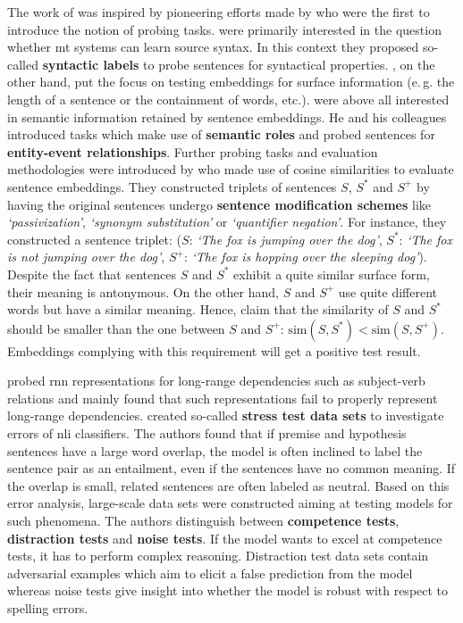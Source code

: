 The work of \citep{Conneau.2018a} was inspired by pioneering efforts made by \citep{Ettinger.2016,Shi.2016,Adi.2017} who were the first to introduce the notion of probing tasks. \citep{Shi.2016} were primarily interested in the question whether \gls{mt} systems can learn source syntax. In this context they proposed so-called \textbf{syntactic labels} to probe sentences for syntactical properties. \citep{Adi.2017}, on the other hand, put the focus on testing embeddings for surface information (e.\,g. the length of a sentence or the  containment of words, etc.). \citep{Ettinger.2016} were above all interested in semantic information retained by sentence embeddings. He and his colleagues introduced tasks which make use of \textbf{semantic roles} and probed sentences for \textbf{entity-event relationships}. Further probing tasks and evaluation methodologies were introduced by \citep{Zhu.2018} who made use of cosine similarities to evaluate sentence embeddings. They constructed triplets of sentences $S$, $S^*$ and $S^+$ by having the original sentences undergo \textbf{sentence modification schemes} like \textit{`passivization'}, \textit{`synonym substitution'} or \textit{`quantifier negation'}. For instance, they constructed a sentence triplet: ($S$: \textit{`The fox is jumping over the dog'}, $S^*$: \textit{`The fox is not jumping over the dog'}, $S^+$: \textit{`The fox is hopping over the sleeping dog'}). Despite the fact that sentences $S$ and $S^*$ exhibit a quite similar surface form, their meaning is antonymous. On the other hand, $S$ and $S^+$ use quite different words but have a similar meaning. Hence, \citep{Zhu.2018} claim that the similarity of $S$ and $S^*$ should be smaller than the one between $S$ and $S^+$: $\text{sim}(S, S^*) < \text{sim}(S, S^+)$. Embeddings complying with this requirement will get a positive test result.

\citep{Linzen.2016,Gulordava.2018} probed \gls{rnn} representations for long-range dependencies such as subject-verb relations and mainly found that such representations fail to properly represent long-range dependencies. \citep{Naik.2018} created so-called \textbf{stress test data sets} to investigate errors of \gls{nli} classifiers. The authors found that if premise and hypothesis sentences have a large word overlap, the model is often inclined to label the sentence pair as an entailment, even if the sentences have no common meaning. If the overlap is small, related sentences are often labeled as neutral. Based on this error analysis, large-scale data sets were constructed aiming at testing models for such phenomena. The authors distinguish between \textbf{competence tests}, \textbf{distraction tests} and \textbf{noise tests}. If the model wants to excel at competence tests, it has to perform complex reasoning. Distraction test data sets contain adversarial examples which aim to elicit a false prediction from the model whereas noise tests give insight into whether the model is robust with respect to spelling errors.

